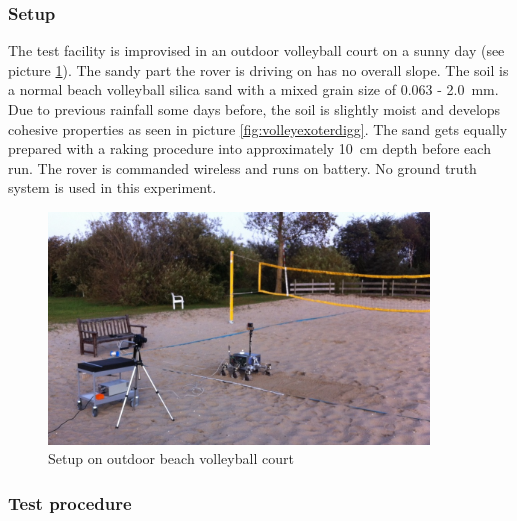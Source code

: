 \documentclass[a4paper,twocolumn]{esapub2005} %
\begin{document}
\subsubsection{Setup} The test facility is improvised in an outdoor volleyball
court on a sunny day (see picture \ref{fig:volley}). The sandy part the rover
is driving on has no overall slope. The soil is a normal beach volleyball
silica sand with a mixed grain size of 0.063 - 2.0~\unit{mm}. Due to previous rainfall
some days before, the soil is slightly moist and develops cohesive properties
as seen in picture \ref{fig:volleyexoterdigg}. The sand gets equally prepared
with a raking procedure into approximately 10~\unit{cm} depth before each run.  The
rover is commanded wireless and runs on battery. No ground truth system is used
in this experiment. 


\begin{figure}[h!]
    \centering
    \includegraphics[width=0.9\textwidth]{volley.jpg}
    \caption{Setup on outdoor beach volleyball court}
    \label{fig:volley}
\end{figure}

\subsubsection{Test procedure}
\end{document}
